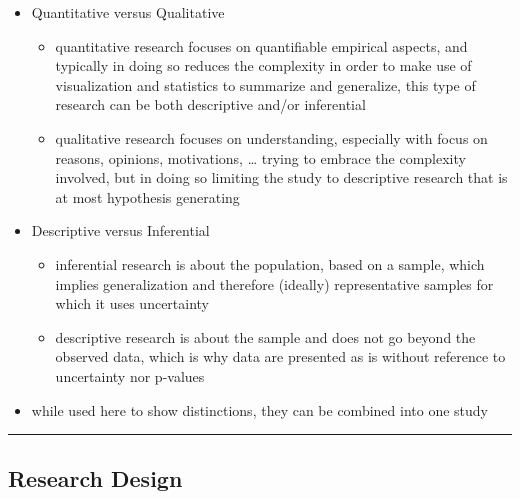 \documentclass[]{article}
\providecommand{\tightlist}{%
  \setlength{\itemsep}{0pt}\setlength{\parskip}{0pt}}
\begin{document}
\begin{itemize}
\tightlist
\item
  Quantitative versus Qualitative

  \begin{itemize}
  \tightlist
  \item
    quantitative research focuses on quantifiable empirical aspects, and
    typically in doing so reduces the complexity in order to make use of
    visualization and statistics to summarize and generalize, this type
    of research can be both descriptive and/or inferential
  \item
    qualitative research focuses on understanding, especially with focus
    on reasons, opinions, motivations, \ldots{} trying to embrace the
    complexity involved, but in doing so limiting the study to
    descriptive research that is at most hypothesis generating 
  \end{itemize}
\item
  Descriptive versus Inferential

  \begin{itemize}
  \tightlist
  \item
    inferential research is about the population, based on a sample,
    which implies generalization and therefore (ideally) representative
    samples for which it uses uncertainty
  \item
    descriptive research is about the sample and does not go beyond the
    observed data, which is why data are presented as is without
    reference to uncertainty nor p-values 
  \end{itemize}
\item
  while used here to show distinctions, they can be combined into one
  study
\end{itemize}

\begin{center}\rule{0.5\linewidth}{\linethickness}\end{center}

\subsection{Research Design}\label{research-design}
\end{document}
